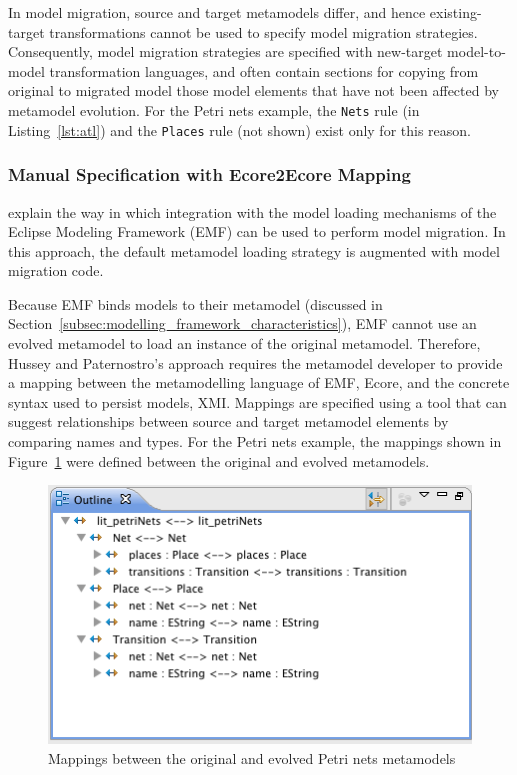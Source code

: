 In model migration, source and target metamodels differ, and hence existing-target transformations cannot be used to specify model migration strategies. Consequently, model migration strategies are specified with new-target model-to-model transformation languages, and often contain sections for copying from original to migrated model those model elements that have not been affected by metamodel evolution. For the Petri nets example, the \texttt{Nets} rule (in Listing~\ref{lst:atl}) and the \texttt{Places} rule (not shown) exist only for this reason.


\subsubsection{Manual Specification with Ecore2Ecore Mapping}
\label{subsubsec:ecore2ecore}
\cite{hussey06advanced} explain the way in which integration with the model loading mechanisms of the Eclipse Modeling Framework (EMF) \cite{steinberg09emf} can be used to perform model migration. In this approach, the default metamodel loading strategy is augmented with model migration code.

Because EMF binds models to their metamodel (discussed in Section~\ref{subsec:modelling_framework_characteristics}), EMF cannot use an evolved metamodel to load an instance of the original metamodel. Therefore, Hussey and Paternostro's approach requires the metamodel developer to provide a mapping between the metamodelling language of EMF, Ecore, and the concrete syntax used to persist models, XMI. Mappings are specified using a tool that can suggest relationships between source and target metamodel elements by comparing names and types. For the Petri nets example, the mappings shown in Figure~\ref{fig:petri_nets_ecore2ecore} were defined between the original and evolved metamodels.

\begin{figure}[htbp]
	\centering
		\includegraphics[scale=0.75]{5.Implementation/images/petri_nets_ecore2ecore.png}
	\caption{Mappings between the original and evolved Petri nets metamodels}
	\label{fig:petri_nets_ecore2ecore}
\end{figure}

